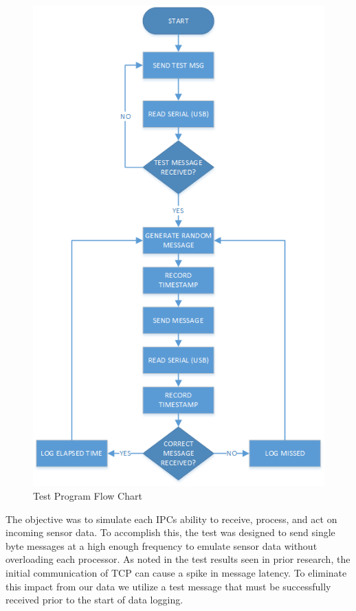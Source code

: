 \begin{figure}[thpb]
 \centering
 \includegraphics[width=1.0\columnwidth]{./images/testflow.png}
  \caption{Test Program Flow Chart}
  \label{fig:test flow}
\end{figure} 

The objective was to simulate each IPCs ability to receive, process, and act on incoming sensor data. To accomplish this, the test was designed to send single byte messages at a high enough frequency to emulate sensor data without overloading each processor. As noted in the test results seen in prior research\cite{REALTIMEACH}, the initial communication of TCP can cause a spike in message latency. To eliminate this impact from our data we utilize a test message that must be successfully received prior to the start of data logging. 

